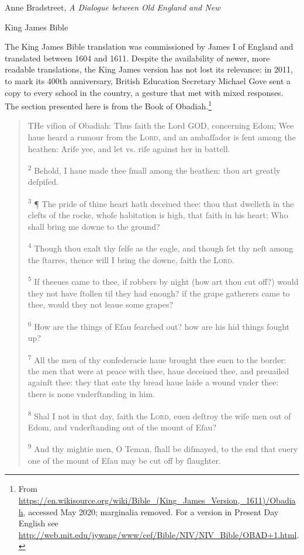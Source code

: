 \begin{texts}{Anne Bradstreet, \emph{A Dialogue between Old England and New}}
\end{texts}

\begin{texts}{King James Bible}

The King James Bible translation was commissioned by James I of England and translated between 1604 and 1611. Despite the availability of newer, more readable translations, the King James version has not lost its relevance: in 2011, to mark its 400th anniversary, British Education Secretary Michael Gove sent a copy to every school in the country, a gesture that met with mixed responses. The section presented here is from the Book of Obadiah.\footnote{From \url{https://en.wikisource.org/wiki/Bible_(King_James_Version,_1611)/Obadiah}, accessed May 2020; marginalia removed. For a version in Present Day English see \url{http://web.mit.edu/jywang/www/cef/Bible/NIV/NIV_Bible/OBAD+1.html}.}

\begin{quote}
    \internallinenumbers*{}
    THe viſion of Obadiah: Thus ſaith the Lord GOD, concerning Edom; Wee haue heard a rumour from the L\textsc{ord}, and an ambaſſador is ſent among the heathen: Ariſe yee, and let vs. riſe against her in battell.

    \textsuperscript{2} Behold, I haue made thee ſmall among the heathen: thou art greatly deſpiſed.

    \textsuperscript{3} ¶ The pride of thine heart hath deceiued thee: thou that dwelleth in the clefts of the rocke, whoſe habitation is high, that ſaith in his heart; Who shall bring me downe to the ground?

    \textsuperscript{4} Though thou exalt thy ſelfe as the eagle, and though ſet thy neſt among the ſtarres, thence will I bring the downe, ſaith the L\textsc{ord}.

    \textsuperscript{5} If theeues came to thee, if robbers by night (how art thou cut off?) would they not have ſtollen til they had enough? if the grape gatherers came to thee, would they not leaue some grapes?

    \textsuperscript{6} How are the things of Eſau ſearched out? how are his hid things ſought up?

    \textsuperscript{7} All the men of thy confederacie haue brought thee euen to the border: the men that were at peace with thee, haue deceiued thee, and preuailed againſt thee: they that eate thy bread haue laide a wound vnder thee: there is none vnderſtanding in him.

    \textsuperscript{8} Shal I not in that day, ſaith the L\textsc{ord}, euen deſtroy the wiſe men out of Edom, and vnderſtanding out of the mount of Eſau?

    \textsuperscript{9} And thy mightie men, O Teman, ſhall be diſmayed, to the end that euery one of the mount of Eſau may be cut off by ſlaughter.
\end{quote}


\end{texts}

